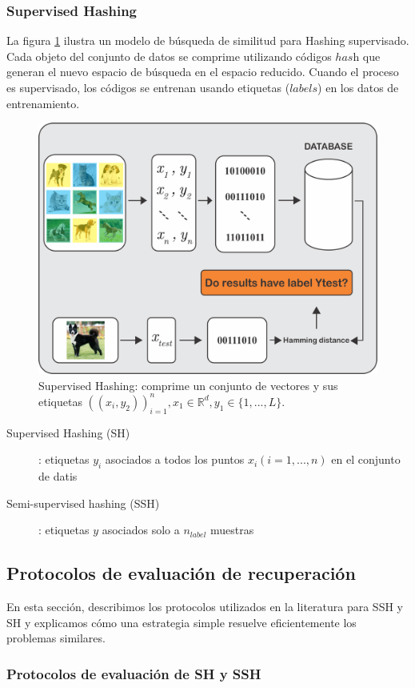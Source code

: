 \subsubsection{Supervised Hashing}
La figura \ref{supervisedhashingcap5} ilustra un modelo de búsqueda de similitud para Hashing supervisado. Cada objeto del conjunto de datos se comprime utilizando códigos $has$h que generan el nuevo espacio de búsqueda en el espacio reducido. Cuando el proceso es supervisado, los códigos se entrenan usando etiquetas ($labels$) en los datos de entrenamiento.
\begin{figure}[htp]
\includegraphics[width=0.7\columnwidth]{chapter5/ima2.png}
\centering
\caption{ Supervised Hashing: comprime un conjunto de vectores y sus etiquetas $((x_i,y_2))^{n}_{i=1}, x_1\in \mathbb{R}^{d}, y_1 \in \{1,...,L\} $.}
\label{supervisedhashingcap5}
\end{figure}

\begin{description}
\item [Supervised Hashing (SH)] : etiquetas $ y_i $ asociados a todos los puntos $ x_i (i = 1, ..., n) $ en el conjunto de datis
\item [Semi-supervised hashing (SSH)] : etiquetas $ y $ asociados solo a  $ n_{label} $ muestras
\end{description}

\subsection{Protocolos de evaluación de recuperación}

En esta sección, describimos los protocolos utilizados en la literatura para SSH y SH y explicamos cómo una estrategia simple resuelve eficientemente los problemas similares.

\subsubsection{Protocolos de evaluación de SH y SSH}

